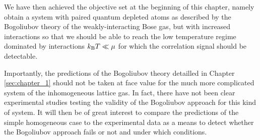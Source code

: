 We have then achieved the objective set at the beginning of this chapter, namely obtain a system with \kmk paired quantum depleted atoms as described by the Bogoliubov theory of the weakly-interacting Bose gas, but with increased interactions so that we should be able to reach the low temperature regime dominated by interactions $k_{\mathrm{B}} T \ll \mu$ for which the \kmk correlation signal should be detectable. 

Importantly, the predictions of the Bogoliubov theory detailled in Chapter \ref{sec:chapter_1} should not be taken at face value for the much more complicated system of the inhomogeneous lattice gas. In fact, there have not been clear experimental studies testing the validity of the Bogoliubov approach for this kind of system. It will then be of great interest to compare the predictions of the simple homogeneous case to the experimental data as a means to detect whether the Bogoliubov approach fails or not and under which conditions.



